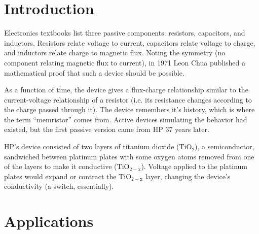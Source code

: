 \documentclass[12pt]{article}
\begin{document}
\maketitle


\section{Introduction}
Electronics textbooks list three passive components: resistors, capacitors, and
inductors.  Resistors relate voltage to current, capacitors relate voltage to
charge, and inductors relate charge to magnetic flux.  Noting the symmetry (no
component relating magnetic flux to current), in 1971 Leon Chua published a
mathematical proof \cite{chua1971} that such a device should be possible.

As a function of time, the device gives a flux-charge relationship similar to
the current-voltage relationship of a resistor (i.e. its resistance changes
according to the charge passed through it).  The device remembers it's history,
which is where the term ``memristor'' comes from.  Active devices simulating
the behavior had existed, but the first passive version came from HP 37 years
later. \cite{strukov2008missing}

HP's device consisted of two layers of titanium dioxide ($\mathrm{TiO_2}$), a
semiconductor, sandwiched between platinum plates with some oxygen atoms
removed from one of the layers to make it conductive ($\mathrm{TiO_{2-x}}$).
Voltage applied to the platinum plates would expand or contract the
$\mathrm{TiO_{2-x}}$ layer, changing the device's conductivity
\cite{williams2008we} (a switch, essentially).

\section{Applications}
\end{document}
